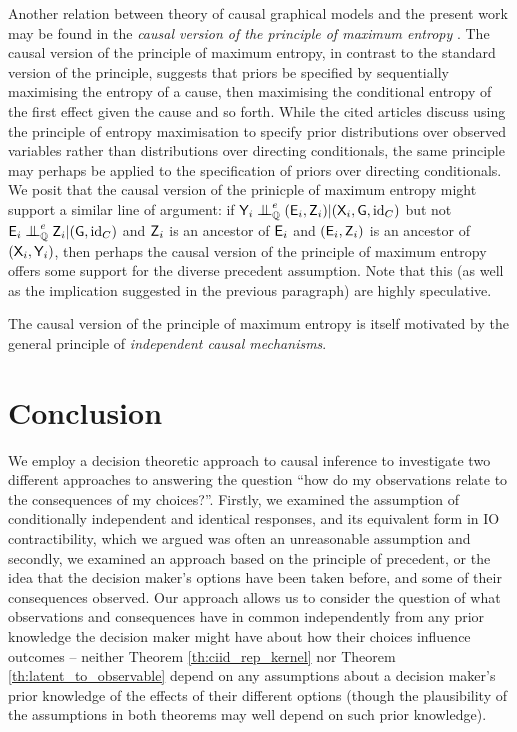 Another relation between theory of causal graphical models and the present work may be found in the \emph{causal version of the principle of maximum entropy} \citep{sunCausalInferenceChoosing2006,janzingCausalVersionsMaximum2021}. The causal version of the principle of maximum entropy, in contrast to the standard version of the principle, suggests that priors be specified by sequentially maximising the entropy of a cause, then maximising the conditional entropy of the first effect given the cause and so forth. While the cited articles discuss using the principle of entropy maximisation to specify prior distributions over observed variables rather than distributions over directing conditionals, the same principle may perhaps be applied to the specification of priors over directing conditionals. We posit that the causal version of the prinicple of maximum entropy might support a similar line of argument: if $\RV{Y}_i\CI^e_{\prob{Q}}(\RV{E}_i,\RV{Z}_i)|(\RV{X}_i,\RV{G},\mathrm{id}_C)$ but not $\RV{E}_i\CI^e_{\prob{Q}} \RV{Z}_i|(\RV{G},\mathrm{id}_C)$ and $\mathsf{Z}_i$ is an ancestor of $\mathsf{E}_i$ and $(\mathsf{E}_i,\mathsf{Z}_i)$ is an ancestor of $(\mathsf{X}_i,\mathsf{Y}_i)$, then perhaps the causal version of the principle of maximum entropy offers some support for the diverse precedent assumption. Note that this (as well as the implication suggested in the previous paragraph) are highly speculative.

The causal version of the principle of maximum entropy is itself motivated by the general principle of \emph{independent causal mechanisms}. 


\section{Conclusion}

We employ a decision theoretic approach to causal inference to investigate two different approaches to answering the question ``how do my observations relate to the consequences of my choices?''. Firstly, we examined the assumption of conditionally independent and identical responses, and its equivalent form in IO contractibility, which we argued was often an unreasonable assumption and secondly, we examined an approach based on the principle of precedent, or the idea that the decision maker's options have been taken before, and some of their consequences observed. Our approach allows us to consider the question of what observations and consequences have in common independently from any prior knowledge the decision maker might have about how their choices influence outcomes -- neither Theorem \ref{th:ciid_rep_kernel} nor Theorem \ref{th:latent_to_observable} depend on any assumptions about a decision maker's prior knowledge of the effects of their different options (though the plausibility of the assumptions in both theorems may well depend on such prior knowledge).

